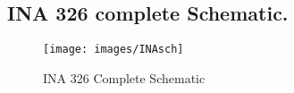 \begin{annexesenv}

\partannexes

\chapter{INA 326 complete Schematic.}

\begin{figure}[!htpb]
\centering
\caption{INA 326 Complete Schematic}
\label{INA_Complete}
\texttt{[image: images/INAsch]}
\end{figure}


\end{annexesenv}
